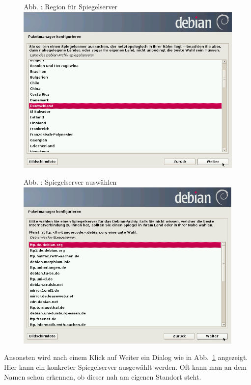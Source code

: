 \documentclass[a4paper,12pt,twoside]{article}
\newcounter{Abb}
\renewcommand\theAbb{\arabic{Abb}}
\begin{document}
\begin{figure}
\centering
\begin{minipage}{11.25cm}
Abb. \stepcounter{Abb}{\theAbb}: Region für Spiegelserver
\includegraphics[width=11.25cm,height=8.437cm]{efaLivede-img/efaLivede-img14.png}\end{minipage}
\end{figure}

\bigskip



\begin{figure}
\centering
\begin{minipage}{11.201cm}
Abb. {\theAbb\label{seq:refAbb13}}: Spiegelserver
auswählen
\includegraphics[width=11.201cm,height=8.446cm]{efaLivede-img/efaLivede-img15.png}\end{minipage}
\end{figure}
Ansonsten wird nach einem Klick auf {\textquotedbl}Weiter{\textquotedbl}
ein Dialog wie in Abb.~\ref{seq:refAbb13} angezeigt. Hier kann ein
konkreter Spiegelserver ausgewählt werden. Oft kann man an dem Namen
schon erkennen, ob dieser nah am eigenen Standort steht.
\end{document}
